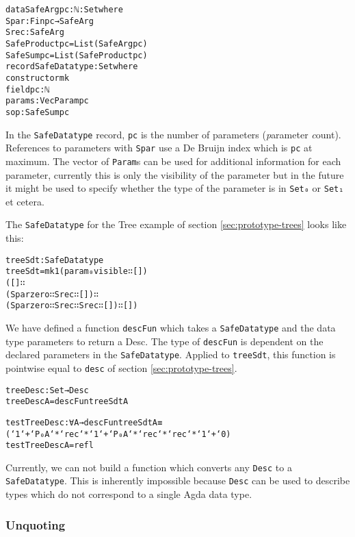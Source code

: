 \begin{alltt}
data SafeArg {pc : ℕ} : Set where
  Spar : Fin pc → SafeArg
  Srec : SafeArg
SafeProduct {pc} = List (SafeArg {pc})
SafeSum {pc} = List (SafeProduct {pc})
record SafeDatatype : Set where
  constructor mk
  field pc : ℕ
        params : Vec Param pc
        sop : SafeSum {pc}
\end{alltt}

In the \texttt{SafeDatatype} record, \texttt{pc} is the number of
parameters (\emph{p}arameter \emph{c}ount).
References to parameters with \texttt{Spar} use a De Bruijn index
which is \texttt{pc} at maximum.
The vector of \texttt{Param}s can be used for additional information
for each parameter, currently this is only the visibility of the
parameter but in the future it might be used to specify whether the
type of the parameter is in \texttt{Set₀} or \texttt{Set₁} et cetera.

The \texttt{SafeDatatype} for the Tree example of section
\ref{sec:prototype-trees} looks like this:

\begin{alltt}
treeSdt : SafeDatatype
treeSdt = mk 1 (param₀ visible ∷ [])
               ([] ∷
                (Spar zero ∷ Srec ∷ []) ∷
                (Spar zero ∷ Srec ∷ Srec ∷ []) ∷ [])
\end{alltt}

We have defined a function
\texttt{descFun} which takes a 
\texttt{SafeDatatype} and the data type parameters to return a Desc.
The type of \texttt{descFun} is dependent on the declared parameters
in the \texttt{SafeDatatype}.
Applied to \texttt{treeSdt}, this function is pointwise equal to
\texttt{desc} of section \ref{sec:prototype-trees}.

\begin{alltt}
treeDesc : Set → Desc
treeDesc A = descFun treeSdt A

testTreeDesc : ∀ A → descFun treeSdt A ≡
  (`1 `+ `P₀ A `* `rec `* `1 `+ `P₀ A `* `rec `* `rec `* `1 `+ `0)
testTreeDesc A = refl
\end{alltt}

Currently, we can not build a function which converts any
\texttt{Desc} to a \texttt{SafeDatatype}.
This is inherently impossible because \texttt{Desc} can be used to
describe types which do not correspond to a single Agda data type.

\subsubsection{Unquoting}\label{sec:prototype-unquoting}

